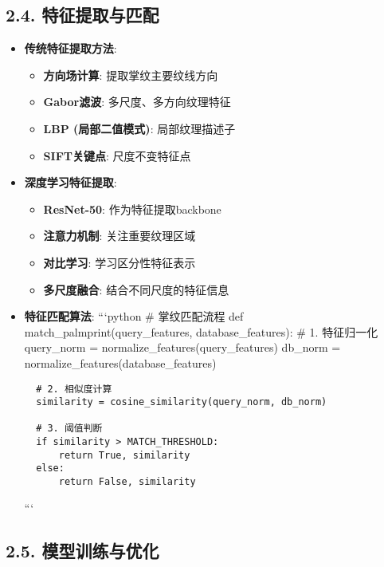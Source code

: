 \subsection{2.4.
特征提取与匹配}\label{ux7279ux5f81ux63d0ux53d6ux4e0eux5339ux914d}

\begin{itemize}
\item
  \textbf{传统特征提取方法}:

  \begin{itemize}
  \tightlist
  \item
    \textbf{方向场计算}: 提取掌纹主要纹线方向
  \item
    \textbf{Gabor滤波}: 多尺度、多方向纹理特征
  \item
    \textbf{LBP (局部二值模式)}: 局部纹理描述子
  \item
    \textbf{SIFT关键点}: 尺度不变特征点
  \end{itemize}
\item
  \textbf{深度学习特征提取}:

  \begin{itemize}
  \tightlist
  \item
    \textbf{ResNet-50}: 作为特征提取backbone
  \item
    \textbf{注意力机制}: 关注重要纹理区域
  \item
    \textbf{对比学习}: 学习区分性特征表示
  \item
    \textbf{多尺度融合}: 结合不同尺度的特征信息
  \end{itemize}
\item
  \textbf{特征匹配算法}: ```python \# 掌纹匹配流程 def
  match\_palmprint(query\_features, database\_features): \# 1.
  特征归一化 query\_norm = normalize\_features(query\_features) db\_norm
  = normalize\_features(database\_features)

\begin{lstlisting}
  # 2. 相似度计算
  similarity = cosine_similarity(query_norm, db_norm)

  # 3. 阈值判断
  if similarity > MATCH_THRESHOLD:
      return True, similarity
  else:
      return False, similarity
\end{lstlisting}

  ```
\end{itemize}

\subsection{2.5.
模型训练与优化}\label{ux6a21ux578bux8badux7ec3ux4e0eux4f18ux5316}

